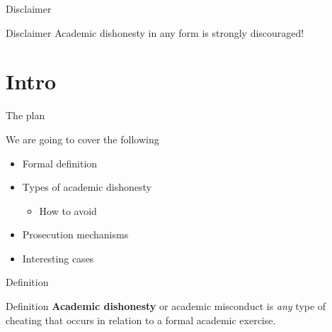 
\begin{frame}{Disclaimer}
	
	\begin{alertblock}{Disclaimer}
		Academic dishonesty in any form is strongly discouraged!
	\end{alertblock}

\end{frame}

\section{Intro}

	\begin{frame}{The plan}
		
		We are going to cover the following

		\begin{itemize}
			\item
				Formal definition
			\item 
				Types of academic dishonesty
				\begin{itemize}
					\item 
						How to avoid
				\end{itemize}
			\item 
				Prosecution mechanisms
			\item
				Interesting cases
		\end{itemize}

	\end{frame}

	\begin{frame}{Definition}
		
		\begin{block}{Definition}
			\textbf{Academic dishonesty} or academic misconduct is \emph{any} type of cheating that occurs in relation to a formal academic exercise.
		\end{block}	

	\end{frame}


